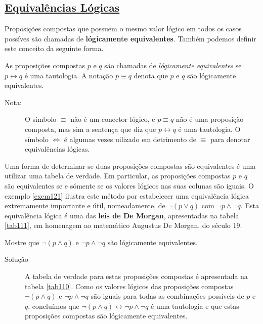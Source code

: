 \subsection*{\underline{Equivalências Lógicas}}

Proposições compostas que possuem o mesmo valor lógico em todos os casos
possíves são chamadas de \textbf{lógicamente equivalentes}. Também podemos
definir este conceito da seguinte forma.

\label{def18}
\begin{defn}
As proposições compostas $p$ e $q$ são chamadas de \emph{lógicamente
equivalentes} se $p \leftrightarrow q$ é uma tautologia. A notação $p \equiv q$
denota que $p$ e $q$ são lógicamente equivalentes.
\end{defn}

\begin{description}
\item[Nota:] O símbolo $\equiv$ não é um conector lógico, e $p \equiv q$ não é
uma proposição composta, mas sim a sentença que diz que $p \leftrightarrow q$ é
uma tautologia. O símbolo $\iff$ é algumas vezes uilizado em detrimento de
$\equiv$ para denotar equivalências lógicas.
\end{description}

Uma forma de determinar se duas proposições compostas são equivalentes é uma
utilizar uma tabela de verdade. Em particular, as proposições compostas $p$ e
$q$ são equivalentes se e sómente se os valores lógicos nas suas colunas são
iguais. O exemplo \ref{exem121} ilustra este método por estabelecer uma
equivalência lógica extremamente importante e útil, nomeadamente, de $\lnot
(p\lor q)$ com $\lnot p \land \lnot q$. Esta equivalência lógica é uma das
\textbf{leis de De Morgan}, apresentadas na tabela \ref{tab111}, em homenagem
ao matemático Augustus De Morgan, do século 19.


\begin{exmp}
\label{exem121}
Mostre que $\lnot (p \land q)$ e $\lnot p \land \lnot q$ são lógicamente
equivalentes.
\end{exmp}

\begin{description}
\item[Solução] A tabela de verdade para estas proposições compostas é
apresentada na tabela \ref{tab110}. Como os valores lógicos das proposições
compostas $\lnot (p \land q)$ e $\lnot p \land \lnot q$ são iguais para todas as
combinações possíveis de $p$ e $q$, concluímos que $\lnot (p \land q)
\leftrightarrow \lnot p \land \lnot q$ é uma tautologia e que estas proposições
compostas são lógicamente equivalentes.
\end{description}

